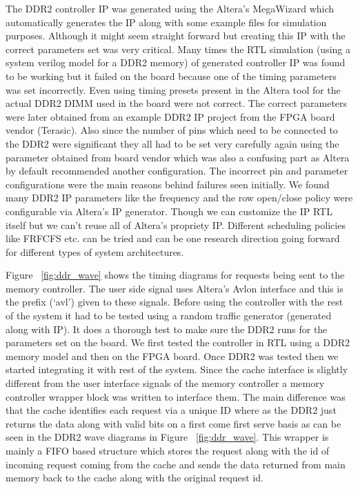 The DDR2 controller IP was generated using the Altera's MegaWizard \cite{quartus} which automatically generates the IP along with some example files for simulation purposes. Although it might seem straight forward but creating this IP with the correct parameters set was very critical. Many times the RTL simulation (using a system verilog model for a DDR2 memory) of generated controller IP was found to be working but it failed on the board because one of the timing parameters was set incorrectly. Even using timing presets present in the Altera tool for the actual DDR2 DIMM used in the board were not correct. The correct parameters were later obtained from an example DDR2 IP project from the FPGA board vendor (Terasic). Also since the number of pins which need to be connected to the DDR2 were significant they all had to be set very carefully again using the parameter obtained from board vendor which was also a confusing part as Altera by default recommended another configuration. The incorrect pin and parameter configurations were the main reasons behind failures seen initially. We found many DDR2 IP parameters like the frequency and the row open/close policy were configurable via Altera's IP generator. Though we can customize the IP RTL itself but we can't reuse all of Altera's propriety IP. Different scheduling policies like FRFCFS etc. can be tried and can be one research direction going forward for different types of system architectures.

Figure ~\ref{fig:ddr_wave} shows the timing diagrams for requests being sent to the memory controller. The user side signal uses Altera's Avlon interface \cite{ddr2} and this is the prefix (`avl') given to these signals.
Before using the controller with the rest of the system it had to be tested using a random traffic generator (generated along with IP). It does a thorough test to make sure the DDR2 runs for the parameters set on the board. We first tested the controller in RTL using a DDR2 memory model and then on the FPGA board. Once DDR2 was tested then we started integrating it with rest of the system. Since the cache interface is slightly different from the user interface signals of the memory controller a memory controller wrapper block was written to interface them. The main difference was that the cache identifies each request via a unique ID where as the DDR2 just returns the data along with valid bits on a first come first serve basis as can be seen in the DDR2 wave diagrams in Figure ~\ref{fig:ddr_wave}. This wrapper is mainly a FIFO based structure which stores the request along with the id of incoming request coming from the cache and sends the data returned from main memory back to the cache along with the original request id.

